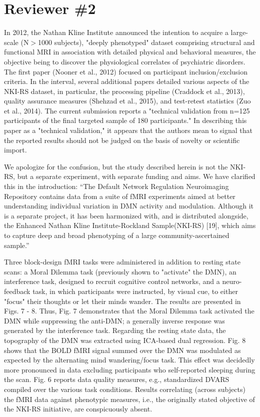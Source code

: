 \documentclass{article}
\newcommand{\RESPONSE}[1]{\textcolor{responseblue}{#1}}
\begin{document}
\section*{Reviewer \#2}

In 2012, the Nathan Kline Institute announced the intention to acquire a large-scale (N$>$1000 subjects), "deeply phenotyped" dataset comprising structural and functional MRI in association with detailed physical and behavioral measures, the objective being to discover the physiological correlates of psychiatric disorders. The first paper (Nooner et al., 2012) focused on participant inclusion/exclusion criteria. In the interval, several additional papers detailed various aspects of the NKI-RS dataset, in particular, the processing pipeline (Craddock et al., 2013), quality assurance measures (Shehzad et al., 2015), and test-retest statistics (Zuo et al., 2014). The current submission reports a "technical validation from n=125 participants of the final targeted sample of 180 participants." In describing this paper as a "technical validation," it appears that the authors mean to signal that the reported results should not be judged on the basis of novelty or
scientific import.

\RESPONSE{We apologize for the confusion, but the study described herein is not the NKI-RS, but a separate experiment, with separate funding and aims. We have clarified this in the introduction: ``The Default Network Regulation Neuroimaging Repository contains data from a suite of fMRI experiments aimed at better understanding individual variation in DMN activity and modulation.  Although it is a separate project, it has been harmonized with, and is distributed alongside, the Enhanced Nathan Kline Institute-Rockland Sample(NKI-RS) [19], which aims to capture deep and broad phenotyping of a large community-ascertained sample.''} 


Three block-design fMRI tasks were administered in addition to resting state scans: a Moral Dilemma task (previously shown to "activate" the DMN), an interference task, designed to recruit cognitive control networks, and a neuro-feedback task, in which participants were instructed, by visual cue, to either "focus" their thoughts or let their minds wander. The results are presented in Figs. 7 - 8. Thus, Fig. 7 demonstrates that the Moral Dilemma task activated the DMN while suppressing the anti-DMN; a generally inverse response was generated by the interference task. Regarding the resting state data, the topography of the DMN was extracted using ICA-based dual regression. Fig. 8 shows that the BOLD fMRI signal summed over the DMN was modulated as expected by the alternating mind wandering/focus task. This effect was decidedly more pronounced in data excluding participants who self-reported sleeping during the scan. Fig. 6 reports data quality measures, e.g., standardized
DVARS compiled over the various task conditions. Results correlating (across subjects) the fMRI data against phenotypic measures, i.e., the originally stated objective of the NKI-RS initiative, are conspicuously absent.
\end{document}

